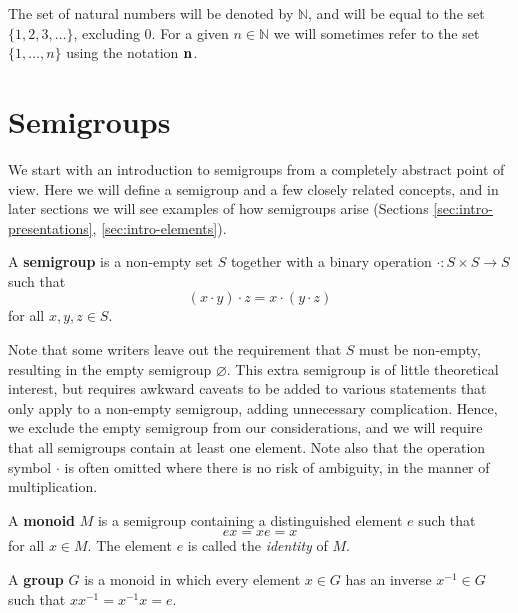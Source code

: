The set of natural numbers will be denoted by $\mathbb{N}$, and will be equal to
the set $\{1, 2, 3, \ldots\}$, excluding $0$.  For a given $n \in \mathbb{N}$ we
will sometimes refer to the set $\{1, \ldots, n\}$ using the notation $\mathbf{n}$.

\section{Semigroups}
\label{sec:intro-semigroups}
We start with an introduction to semigroups from a completely abstract point of
view.  Here we will define a semigroup and a few closely related concepts, and
in later sections we will see examples of how semigroups arise (Sections
\ref{sec:intro-presentations}, \ref{sec:intro-elements}). %

\begin{definition}
  \label{def:semigroup}
  A \textbf{semigroup} is a non-empty set $S$ together with
  a binary operation $\cdot: S \times S \to S$ such that
  $$(x \cdot y) \cdot z = x \cdot (y \cdot z)$$
  for all $x, y, z \in S$.
\end{definition}
Note that some writers leave out the requirement that $S$ must be non-empty,
resulting in the empty semigroup $\varnothing$.  This extra semigroup is of
little theoretical interest, but requires awkward caveats to be added to various
statements that only apply to a non-empty semigroup, adding unnecessary
complication.  Hence, we exclude the empty semigroup from our considerations,
and we will require that all semigroups contain at least one element.  Note also
that the operation symbol $\cdot$ is often omitted where there is no risk of
ambiguity, in the manner of multiplication.

\begin{definition}
  \label{def:monoid}
  A \textbf{monoid} $M$ is a semigroup containing a distinguished element $e$
  such that
  $$ex = xe = x$$
  for all $x \in M$.  The element $e$ is called the \textit{identity} of $M$.
\end{definition}

\begin{definition}
  \label{def:group}
  A \textbf{group} $G$ is a monoid in which every element $x \in G$ has an
  inverse $x^{-1} \in G$ such that $xx^{-1}=x^{-1}x = e$.
\end{definition}

